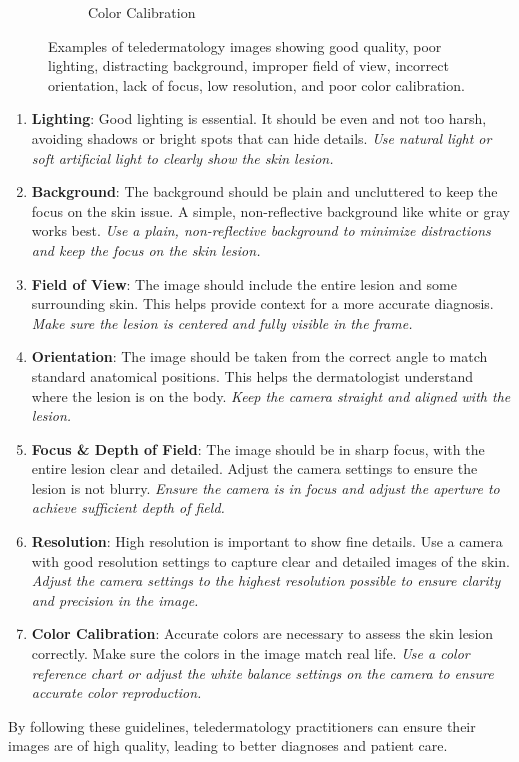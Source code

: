 \begin{figure}[ht]
\begin{subfigure}[b]{0.24\textwidth}
        \caption{Color Calibration}
        \label{fig:cc}
    \end{subfigure}
    \caption{Examples of teledermatology images showing good quality, poor lighting, distracting background, improper field of view, incorrect orientation, lack of focus, low resolution, and poor color calibration.}
    \label{fig:quality_criteria}
\end{figure}
\begin{enumerate}
    \item \textbf{Lighting}:  Good lighting is essential. It should be even and not too harsh, avoiding shadows or bright spots that can hide details. \textit{Use natural light or soft artificial light to clearly show the skin lesion.}
    \item \textbf{Background}:  The background should be plain and uncluttered to keep the focus on the skin issue. A simple, non-reflective background like white or gray works best. \textit{Use a plain, non-reflective background to minimize distractions and keep the focus on the skin lesion.}
    \item \textbf{Field of View}: The image should include the entire lesion and some surrounding skin. This helps provide context for a more accurate diagnosis. \textit{Make sure the lesion is centered and fully visible in the frame.}
    \item \textbf{Orientation}: The image should be taken from the correct angle to match standard anatomical positions. This helps the dermatologist understand where the lesion is on the body. \textit{Keep the camera straight and aligned with the lesion.}
    \item \textbf{Focus \& Depth of Field}: The image should be in sharp focus, with the entire lesion clear and detailed. Adjust the camera settings to ensure the lesion is not blurry. \textit{Ensure the camera is in focus and adjust the aperture to achieve sufficient depth of field.}
    \item \textbf{Resolution}: High resolution is important to show fine details. Use a camera with good resolution settings to capture clear and detailed images of the skin. \textit{Adjust the camera settings to the highest resolution possible to ensure clarity and precision in the image.}
    \item \textbf{Color Calibration}:  Accurate colors are necessary to assess the skin lesion correctly. Make sure the colors in the image match real life. \textit{Use a color reference chart or adjust the white balance settings on the camera to ensure accurate color reproduction.}
\end{enumerate}
By following these guidelines, teledermatology practitioners can ensure their images are of high quality, leading to better diagnoses and patient care.


